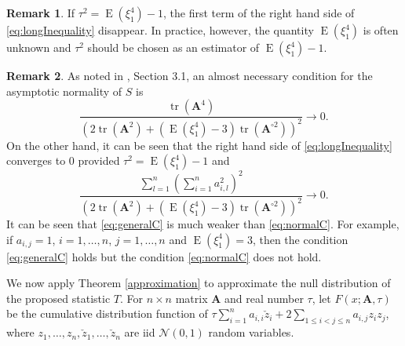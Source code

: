 \documentclass[11pt]{article}
\DeclareMathOperator{\mytr}{tr}
\DeclareMathOperator{\myE}{E}
\newcommand{\BA}{\mathbf{A}}    \newcommand{\BB}{\mathbf{B}}    \newcommand{\BC}{\mathbf{C}}    \newcommand{\BD}{\mathbf{D}}    \newcommand{\BE}{\mathbf{E}}    \newcommand{\BF}{\mathbf{F}}    \newcommand{\BG}{\mathbf{G}}    \newcommand{\BH}{\mathbf{H}}    \newcommand{\BI}{\mathbf{I}}    \newcommand{\BJ}{\mathbf{J}}    \newcommand{\BK}{\mathbf{K}}    \newcommand{\BL}{\mathbf{L}}
\theoremstyle{plain}
\theoremstyle{definition}
\newtheorem{remark}{\quad\quad Remark}
\theoremstyle{remark}
\begin{document}
\begin{remark}\label{remark1}
    If $\tau^2=\myE (\xi_1^4) -1$, the first term of the right hand side of \eqref{eq:longInequality} disappear.
    In practice, however, the quantity $\myE (\xi_1^4)$ is often unknown and
    $\tau^2$ should be chosen as an estimator of $\myE (\xi_1^4)-1$.
\end{remark}

\begin{remark}
    As noted in \cite{Chatterjee2008}, Section 3.1, an almost necessary condition for the asymptotic normality of $S$ is
    \begin{equation}\label{eq:normalC}
        \frac{\mytr (\BA^4)}{
            \left( 
        2 \mytr(\BA^2)
    +
    (\myE (\xi_1^4)-3)\mytr(\BA^{\circ 2})
            \right)^2
        }\to 0. 
    \end{equation}
    On the other hand, it can be seen that the right hand side of \eqref{eq:longInequality} converges to $0$ provided $\tau^2=\myE (\xi_1^4)-1$ and
    \begin{equation}\label{eq:generalC}
            \frac{
                \sum_{l=1}^n \left( \sum_{i=1}^n a_{i,l}^2 \right)^2
            }{
            \left(
        2 \mytr(\BA^2)
    +
    (\myE (\xi_1^4)-3)\mytr(\BA^{\circ 2})
\right)^{2}
            }
            \to 0.
    \end{equation}
    It can be seen that \eqref{eq:generalC} is much weaker than \eqref{eq:normalC}.
    For example, if $a_{i,j}=1$, $i=1,\ldots, n$, $j=1,\ldots, n$ and $\myE (\xi_1^4)=3$, then the condition \eqref{eq:generalC} holds but the condition \eqref{eq:normalC} does not hold.
\end{remark}


We now apply Theorem \ref{approximation} to approximate the null distribution of the proposed statistic $T$.
For $n\times n$ matrix $\BA$ and real number $\tau$, let $F (x;{\BA,\tau})$ be the cumulative distribution function of $
        \tau \sum_{i=1}^n  a_{i,i}\check z_i
    +2\sum_{1\leq i <j \leq n} a_{i,j} z_i z_j
    $,
    where $z_1,\ldots, z_n, \check z_1, \ldots, \check z_n$ are iid  $\mathcal N(0,1)$ random variables.
\end{document}
